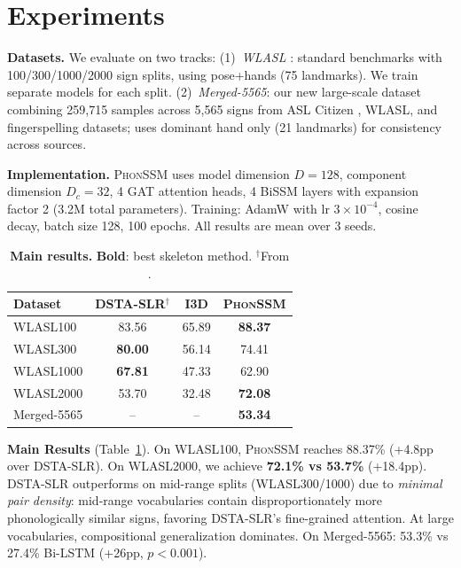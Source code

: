 \documentclass{article}
\newcommand{\phonssm}{\textsc{PhonSSM}}
\begin{document}
\section{Experiments}
\label{sec:experiments}

\textbf{Datasets.} We evaluate on two tracks: (1)~\textit{WLASL} \citep{li2020word}: standard benchmarks with 100/300/1000/2000 sign splits, using pose+hands (75 landmarks). We train separate models for each split. (2)~\textit{Merged-5565}: our new large-scale dataset combining 259,715 samples across 5,565 signs from ASL Citizen \citep{desai2023asl}, WLASL, and fingerspelling datasets; uses dominant hand only (21 landmarks) for consistency across sources.

\textbf{Implementation.} \phonssm{} uses model dimension $D{=}128$, component dimension $D_c{=}32$, 4 GAT attention heads, 4 BiSSM layers with expansion factor 2 (3.2M total parameters). Training: AdamW with lr $3{\times}10^{-4}$, cosine decay, batch size 128, 100 epochs. All results are mean over 3 seeds.

\begin{table}[t]
\caption{\textbf{Main results.} \textbf{Bold}: best skeleton method. $^\dagger$From \citet{hu2024dsta}.}
\label{tab:datasets}
\vspace{-2mm}
\begin{center}
\begin{small}
\begin{tabular*}{\columnwidth}{@{\extracolsep{\fill}}lccc@{}}
\toprule
Dataset & DSTA-SLR$^\dagger$ & I3D & \phonssm{} \\
\midrule
WLASL100 & 83.56 & 65.89 & \textbf{88.37} \\
WLASL300 & \textbf{80.00} & 56.14 & 74.41 \\
WLASL1000 & \textbf{67.81} & 47.33 & 62.90 \\
WLASL2000 & 53.70 & 32.48 & \textbf{72.08} \\
\midrule
Merged-5565 & -- & -- & \textbf{53.34} \\
\bottomrule
\end{tabular*}
\end{small}
\end{center}
\vspace{-3mm}
\end{table}

\textbf{Main Results} (Table~\ref{tab:datasets}). On WLASL100, \phonssm{} reaches 88.37\% (+4.8pp over DSTA-SLR). On WLASL2000, we achieve \textbf{72.1\% vs 53.7\%} (+18.4pp). DSTA-SLR outperforms on mid-range splits (WLASL300/1000) due to \textit{minimal pair density}: mid-range vocabularies contain disproportionately more phonologically similar signs, favoring DSTA-SLR's fine-grained attention. At large vocabularies, compositional generalization dominates. On Merged-5565: 53.3\% vs 27.4\% Bi-LSTM (+26pp, $p{<}0.001$).
\end{document}
